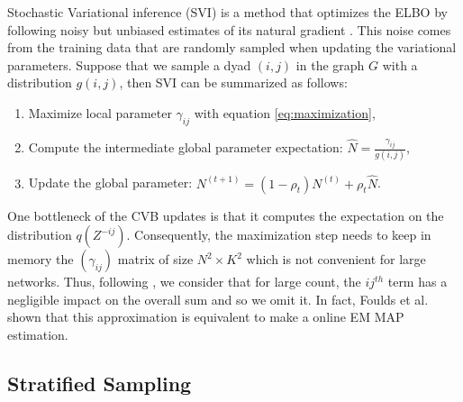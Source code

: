 Stochastic Variational inference (SVI) is a method that optimizes the ELBO by following noisy but unbiased estimates of its natural gradient \cite{hoffman2013stochastic}. This noise comes from the training data that are randomly sampled when updating the variational parameters. Suppose  that we sample a dyad $(i,j)$ in the graph $G$ with a distribution $g(i,j)$, then SVI can be summarized as follows:
\begin{enumerate}
\item Maximize local parameter $\gamma_{ij}$ with equation \eqref{eq:maximization},
\item Compute the intermediate global parameter expectation: $\hat N = \frac{\gamma_{ij}}{g(i,j)}$,
\item Update the global parameter: $N^{(t+1)} = (1-\rho_t)N^{(t)} + \rho_t \hat N$.
\end{enumerate}

One bottleneck of the CVB updates is that it computes the expectation on the distribution $q(Z^{-ij})$. Consequently, the maximization step needs to keep in memory the $(\gamma_{ij})$ matrix of size $N^2\times K^2$ which is not convenient for large networks. Thus, following \cite{foulds2013stochastic}, we consider that for large count, the $ij^{th}$ term has a negligible impact on the overall sum and so we omit it. In fact, Foulds et al. shown that this approximation is equivalent to make a online EM MAP estimation.

\subsection{Stratified Sampling}
\label{sec:sampling}

